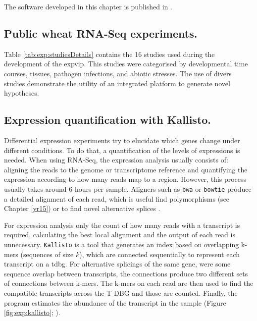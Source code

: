 The software developed in this chapter is published in \cite*{Borrill2016}. 



\subsection{Public wheat RNA-Seq experiments.}

Table \ref{tab:exp:studiesDetails} contains the 16 studies used during the development of the \gls{expvip}. 
This studies were categorised by developmental time courses, tissues, pathogen infections, and abiotic stresses. 
The use of divers studies demonstrate the utility of an integrated platform to generate novel hypotheses. 



\subsection{Expression quantification with Kallisto.}
\label{exp:kallisto}
Differential expression experiments try to elucidate which genes change under different conditions. 
To do that, a quantification of the levels of expressions is needed. 
When using RNA-Seq, the expression analysis usually consists of: aligning the reads to the genome or transcriptome reference and quantifying the expression according to how many reads map to a region. 
However, this process usually takes around 6 hours per sample. 
Aligners such as \texttt{bwa} or \texttt{bowtie} produce a detailed alignment of each read, which is useful find polymorphisms (see Chapter \ref{yr15}) or to find novel alternative splices \citep{Trapnell2012}. 

For expression analysis only the count of how many reads with a transcript is required, calculating the best local alignment and the output of each read is unnecessary. 
\verb|Kallisto| is a tool that generates an index based on overlapping k-mers (sequences of size $k$), which are connected sequentially to represent each transcript  on a \gls{tdbg}. 
For alternative splicings of the same gene, were some sequence overlap between transcripts, the connections produce two different sets of connections between k-mers. 
The k-mers on each read are then used to find the compatible transcripts across the T-DBG and those are counted. 
Finally, the program estimates the abundance of the transcript in the sample (Figure \ref{fig:exp:kallisto}; \citealt{Bray2016}).  


